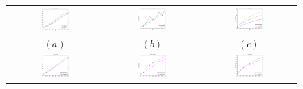 \begin{figure}[htbp]
  \begin{center}
    \begin{tabular}{ccc}
      \includegraphics[width=0.32\textwidth]{error_pos.eps} &
      \includegraphics[width=0.32\textwidth]{error_ori.eps} &
      \includegraphics[width=0.32\textwidth]{error_pst.eps} \\
      $(a)$ & $(b)$ & $(c)$ \\
      \includegraphics[width=0.32\textwidth]{error_cmp_pos.eps} &
      \includegraphics[width=0.32\textwidth]{error_cmp_ori.eps} &
      \includegraphics[width=0.32\textwidth]{error_cmp_pst.eps} \\

\end{tabular}
\end{center}
\end{figure}
